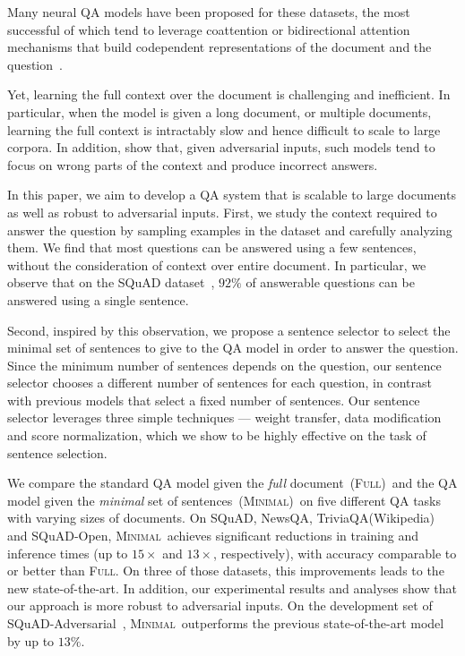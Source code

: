 \documentclass[11pt,a4paper]{article}
\newcommand{\full}{\textsc{Full}}
\newcommand{\ours}{\textsc{Minimal}}
\newcommand{\fullshort}{(\textsc{Full})}
\newcommand{\oursshort}{(\textsc{Minimal})}
\newcommand{\fulllong}{the standard QA model given the {\em full} document}
\newcommand{\ourslong}{the QA model given the {\em minimal} set of sentences}
\begin{document}
Many neural QA models have been proposed for these datasets, the most successful of which tend to leverage coattention or bidirectional attention mechanisms that build codependent representations of the document and the question~\cite{dcn+,bidaf}.

Yet, learning the full context over the document is challenging and inefficient.
In particular, when the model is given a long document, or multiple documents, learning the full context is intractably slow and hence difficult to scale to large corpora.
In addition, \citet{squad-adversarial} show that, given adversarial inputs, such models tend to focus on wrong parts of the context and produce incorrect answers.

In this paper, we aim to develop a QA system that is scalable to large documents as well as robust to adversarial inputs.
First, we study the context required to answer the question by sampling examples in the dataset and carefully analyzing them.
We find that most questions can be answered using a few sentences, without the consideration of context over entire document.
In particular, we observe that on the SQuAD dataset~\cite{squad}, $92\%$ of answerable questions can be answered using a single sentence.

Second, inspired by this observation, we propose a sentence selector to select the minimal set of sentences to give to the QA model in order to answer the question.
Since the minimum number of sentences depends on the question, our sentence selector chooses a different number of sentences for each question, in contrast with previous models that select a fixed number of sentences.
Our sentence selector leverages three simple techniques --- weight transfer, data modification and score normalization, which we show to be highly effective on the task of sentence selection.



We compare \fulllong~\fullshort~and \ourslong~\oursshort~on five different QA tasks with varying sizes of documents.
On SQuAD, NewsQA, TriviaQA(Wikipedia) and SQuAD-Open, \ours~achieves significant reductions in training and inference times (up to $15\times$ and $13\times$, respectively), with accuracy comparable to or better than \full. On three of those datasets, this improvements leads to the new state-of-the-art.
In addition, our experimental results and analyses show that our approach is more robust to adversarial inputs. On the development set of SQuAD-Adversarial~\cite{squad-adversarial}, \ours~outperforms the previous state-of-the-art model by up to $13\%$.
\end{document}
